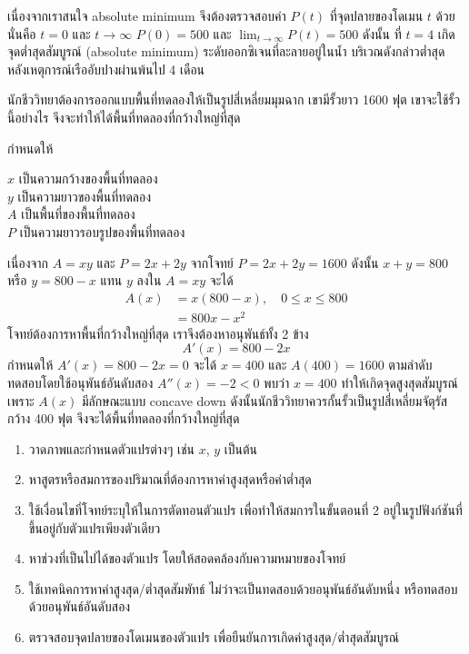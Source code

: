\documentclass[
]{book}
\begin{document}
เนื่องจากเราสนใจ absolute minimum จึงต้องตรวจสอบค่า \(P(t)\) ที่จุดปลายของโดเมน
\(t\) ด้วย นั่นคือ \(t = 0\) และ \(t \rightarrow \infty\) \(P(0)=500\) และ
\(\lim_{t \rightarrow \infty} P(t) = 500\) ดังนั้น ที่ \(t=4\) เกิดจุดต่ำสุดสัมบูรณ์
(absolute minimum) ระดับออกซิเจนที่ละลายอยู่ในน้ำ บริเวณดังกล่าวต่ำสุด
หลังเหตุการณ์เรืออับปางผ่านพ้นไป 4 เดือน

นักชีววิทยาต้องการออกแบบพื้นที่ทดลองให้เป็นรูปสี่เหลี่ยมมุมฉาก เขามีรั้วยาว 1600 ฟุต
เขาจะใช้รั้วนี้อย่างไร จึงจะทำให้ได้พื้นที่ทดลองที่กว้างใหญ่ที่สุด

กำหนดให้

\(x\) เป็นความกว้างของพื้นที่ทดลอง\\
\(y\) เป็นความยาวของพื้นที่ทดลอง\\
\(A\) เป็นพื้นที่ของพื้นที่ทดลอง\\
\(P\) เป็นความยาวรอบรูปของพื้นที่ทดลอง

เนื่องจาก \(A=xy\) และ \(P=2x+2y\) จากโจทย์ \(P=2x+2y=1600\) ดังนั้น
\(x+y=800\) หรือ \(y=800-x\) แทน \(y\) ลงใน \(A=xy\) จะได้
\begin{equation}   \begin{aligned}
    A(x)  &=x(800-x), \quad  0 \le x \le 800 \\
            &=800x-x^2
  \end{aligned} \end{equation} โจทย์ต้องการหาพื้นที่กว้างใหญ่ที่สุด
เราจึงต้องหาอนุพันธ์ทั้ง 2 ข้าง \[A'(x)=800-2x\] กำหนดให้ \(A'(x)=800-2x=0\) จะได้
\(x=400\) และ \(A(400)=1600\) ตามลำดับ ทดสอบโดยใช้อนุพันธ์อันดับสอง
\(A''(x)=-2<0\) พบว่า \(x=400\) ทำให้เกิดจุดสูงสุดสัมบูรณ์ เพราะ \(A(x)\)
มีลักษณะแบบ concave down ดังนั้นนักชีววิทยาควรกั้นรั้วเป็นรูปสี่เหลี่ยมจัตุรัสกว้าง 400 ฟุต
จึงจะได้พื้นที่ทดลองที่กว้างใหญ่ที่สุด

\begin{enumerate}
\def\labelenumi{\arabic{enumi}.}
\item
  วาดภาพและกำหนดตัวแปรต่างๆ เช่น \(x\), \(y\) เป็นต้น
\item
  หาสูตรหรือสมการของปริมาณที่ต้องการหาค่าสูงสุดหรือค่าต่ำสุด
\item
  ใช้เงื่อนไขที่โจทย์ระบุให้ในการตัดทอนตัวแปร เพื่อทำให้สมการในขั้นตอนที่ 2
  อยู่ในรูปฟังก์ชันที่ขึ้นอยู่กับตัวแปรเพียงตัวเดียว
\item
  หาช่วงที่เป็นไปได้ของตัวแปร โดยให้สอดคล้องกับความหมายของโจทย์
\item
  ใช้เทคนิคการหาค่าสูงสุด/ต่ำสุดสัมพัทธ์ ไม่ว่าจะเป็นทดสอบด้วยอนุพันธ์อันดับหนึ่ง
  หรือทดสอบด้วยอนุพันธ์อันดับสอง
\item
  ตรวจสอบจุดปลายของโดเมนของตัวแปร เพื่อยืนยันการเกิดค่าสูงสุด/ต่ำสุดสัมบูรณ์
\end{enumerate}
\end{document}
